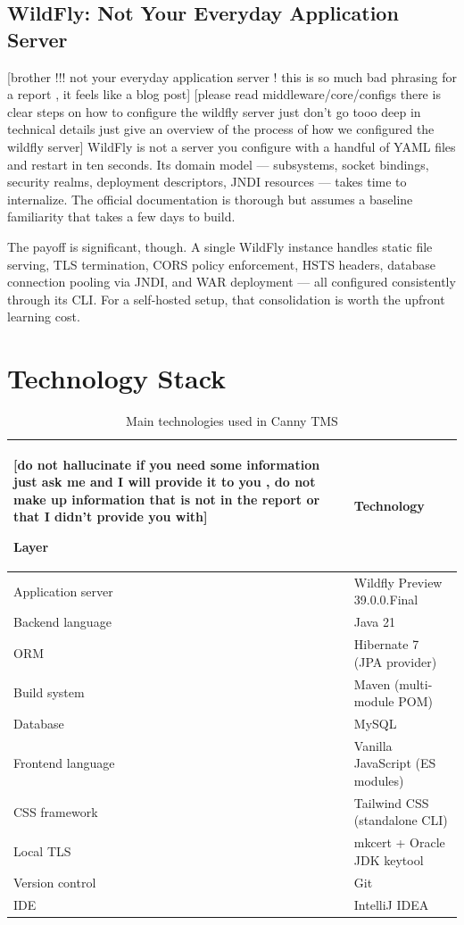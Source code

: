 \subsection{WildFly: Not Your Everyday Application Server}
[brother !!! not your everyday application server ! this is so much bad phrasing for a report , it feels like a blog post]
[please read middleware/core/configs there is clear steps on how to configure the wildfly server just don't go tooo deep in technical details just give an overview of the process
 of how we configured the wildfly server]
WildFly is not a server you configure with a handful of YAML files and restart in ten
seconds. Its domain model --- subsystems, socket bindings, security realms, deployment
descriptors, JNDI resources --- takes time to internalize. The official documentation is
thorough but assumes a baseline familiarity that takes a few days to build.

The payoff is significant, though. A single WildFly instance handles static file serving,
TLS termination, CORS policy enforcement, HSTS headers, database connection pooling via
JNDI, and WAR deployment --- all configured consistently through its CLI. For a
self-hosted setup, that consolidation is worth the upfront learning cost.


\section{Technology Stack}

\begin{table}[H]
    \centering
    \caption{Main technologies used in Canny TMS}
    \label{tab:techstack}
    \begin{tabular}{ll}
        [do not hallucinate if you need some information just ask me and I will provide it to you , do not make up information that is not in the report or that I didn't provide you with]

        \hline
        \textbf{Layer} & \textbf{Technology} \\
        \hline
        Application server   & Wildfly Preview 39.0.0.Final   \\
        Backend language     & Java 21  \\
        ORM                  & Hibernate 7 (JPA provider)            \\
        Build system         & Maven (multi-module POM)              \\
        Database             & MySQL                                 \\
        Frontend language    & Vanilla JavaScript (ES modules)       \\
        CSS framework        & Tailwind CSS (standalone CLI)         \\
        Local TLS            & mkcert + Oracle JDK keytool           \\
        Version control      & Git                                   \\
        IDE                  & IntelliJ IDEA                         \\
        \hline
    \end{tabular}
\end{table}

